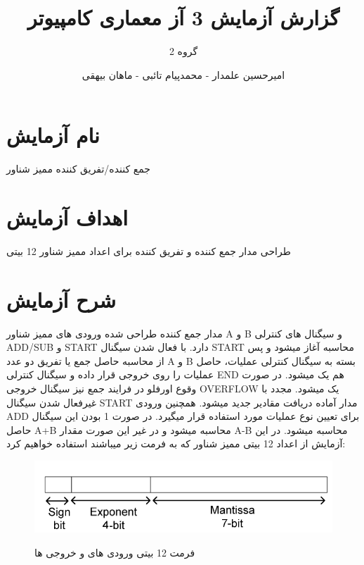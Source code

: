 \documentclass[twoside]{article}
\title{\Huge گزارش آزمایش 3 آز معماری کامپیوتر }
\author{\Large گروه 2}
\date{\Large امیرحسین علمدار - محمدپیام تائبی - ماهان بیهقی}
\begin{document}
	\maketitle
	\newpage
	\section*{نام آزمایش}
	جمع کننده/تفریق کننده ممیز شناور
	\section*{اهداف آزمایش}
	طراحی مدار جمع کننده و تفریق کننده برای اعداد ممیز شناور 12 بیتی
	
	\section*{شرح آزمایش}
	مدار جمع کننده طراحی شده ورودی های ممیز شناور A و B و سیگنال های کنترلی ADD/SUB و START دارد. با فعال شدن سیگنال START محاسبه آغاز میشود و پس از محاسبه حاصل جمع یا تفریق دو عدد A و B بسته به سیگنال کنترلی عملیات، حاصل عملیات را روی خروجی قرار داده و سیگنال کنترلی END هم یک میشود. در صورت وقوع اورفلو در فرایند جمع نیز سیگنال خروجی OVERFLOW یک میشود. مجدد با غیرفعال شدن سیگنال START مدار آماده دریافت مقادیر جدید میشود. همچنین ورودی ADD برای تعیین نوع عملیات مورد استفاده قرار میگیرد. در صورت 1 بودن این سیگنال حاصل A+B محاسبه میشود و در غیر این صورت مقدار A-B محاسبه میشود.
	در این آزمایش از اعداد 12 بیتی ممیز شناور که به فرمت زیر میباشند استفاده خواهیم کرد:
	\begin{figure}[h!]
		\begin{center}
			\includegraphics[scale=0.4]{format}‎
			\caption{فرمت 12 بیتی ورودی های و خروجی ها}
		\end{center}
	\end{figure} 
	
\end{document}
